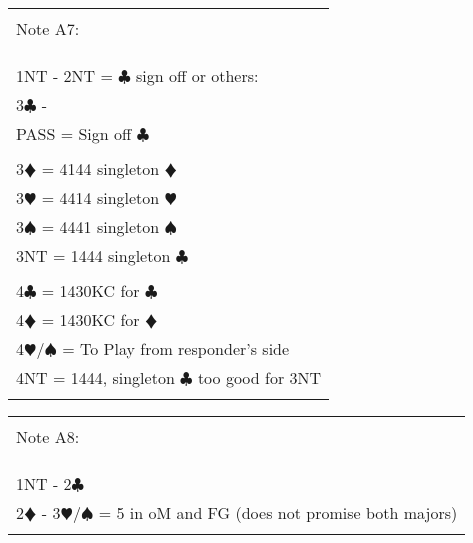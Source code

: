 \documentclass{article}
\newcommand\C{\ensuremath{\clubsuit}}
\newcommand\D{\color{red}\ensuremath{\vardiamondsuit}}
\renewcommand\H{\color{red}\ensuremath{\varheartsuit}}
\renewcommand\S{\ensuremath{\spadesuit}}
\newcommand\N{{\footnotesize NT}}
\begin{document}
\begin{tabular}{|l|}
\hline \\[-1em]
\cellcolor{green!25} \Large Note A7: \\[-1em] 
\\ \hline
\\
\\ \Large 1{\N} - 2{\N} = {\C} sign off or others:
\\ \Large 3{\C} - 
\\ \Large \hspace{10mm} PASS = Sign off {\C} \\
\\ \Large \hspace{10mm} 3{\D} = 4144 singleton {\D}  
\\ \Large \hspace{10mm} 3{\H} = 4414 singleton {\H}  
\\ \Large \hspace{10mm} 3{\S} = 4441 singleton {\S}  
\\ \Large \hspace{10mm} 3{\N} = 1444 singleton {\C}   \\
\\ \Large \hspace{10mm} 4{\C} = 1430KC for {\C} 
\\ \Large \hspace{10mm} 4{\D} = 1430KC for {\D} 
\\ \Large \hspace{10mm} 4{\H}/{\S} = To Play from responder's side
\\ \Large \hspace{10mm} 4{\N} = 1444, singleton {\C} too good for 3{\N} \\
\\ \hline
\end{tabular}

\begin{tabular}{|l|}
\hline \\[-1em]
\cellcolor{green!25} \Large Note A8: \\[-1em] 
\\ \hline
\\
\\ \Large 1{\N} - 2{\C} 
\\ \Large {2\D} - 3{\H}/{\S} = 5 in oM and FG (does not promise both majors) \\
\\ \hline
\end{tabular}
\end{document}

